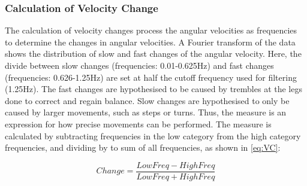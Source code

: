 \subsubsection{Calculation of Velocity Change}

The calculation of velocity changes process the angular velocities as frequencies to determine the changes in angular velocities. A Fourier transform of the data shows the distribution of slow and fast changes of the angular velocity. Here, the divide between slow changes (frequencies: 0.01-0.625Hz) and fast changes (frequencies: 0.626-1.25Hz) are set at half the cutoff frequency used for filtering (1.25Hz).
The fast changes are hypothesised to be caused by trembles at the legs done to correct and regain balance. Slow changes are hypothesised to only be caused by larger movements, such as steps or turns. Thus, the measure is an expression for how precise movements can be performed. The measure is calculated by subtracting frequencies in the low category from the high category frequencies, and dividing by to sum of all frequencies, as shown in \eqref{eq:VC}:


\begin{equation} \label{eq:VC}
Change = \frac{LowFreq-HighFreq}{LowFreq+HighFreq}
\end{equation}


